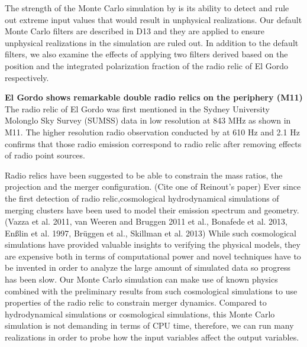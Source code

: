 The strength of the Monte Carlo simulation by  is its ability
to detect and rule out extreme input values that would result in
unphysical realizations. 
Our default Monte Carlo filters are described in D13 and they are applied to ensure 
unphysical realizations in the simulation are ruled out. 
In addition to the default filters, we also examine the effects of applying 
two filters derived based on the position and the integrated polarization
fraction of the radio relic of El Gordo respectively. 

\textbf{El Gordo shows remarkable double radio relics on the periphery
(M11)} The radio relic  of El Gordo was first mentioned in the Sydney University
Molonglo Sky Survey (SUMSS) data in low resolution at 843 MHz
\cite{Mauch03} as shown in
M11. The higher resolution radio observation conducted by \cite{L13} at 610
\mega Hz and 2.1 \giga Hz confirms that those radio emission correspond to
radio relic after removing effects of radio point sources.

Radio relics have been suggested to be able to constrain the
mass ratios, the projection and the merger configuration. (Cite one of Reinout's paper) 
Ever since the first detection of radio relic,cosmological hydrodynamical simulations of
merging clusters have been used to model their emission spectrum and
geometry. (Vazza et al. 2011, van Weeren and Bruggen 2011 et al., Bonafede
et al. 2013, En{\ss}lin et al. 1997, Br\"{u}ggen et al.,  Skillman et al.
2013) While such cosmological simulations have provided valuable insights
to verifying the physical models, they are expensive both in terms of
computational power and novel techniques have to be invented in order to
analyze the large amount of simulated data so progress has been slow. 
Our Monte Carlo simulation can make use of known physics combined with the
preliminary results from such cosmological simulations to use properties of
the radio relic to constrain merger dynamics. 
Compared to hydrodynamical simulations or cosmological simulations, this
    Monte Carlo simulation is not demanding in terms of CPU time, therefore, we
    can run many realizations in order to probe how the input variables
affect the output variables. 

